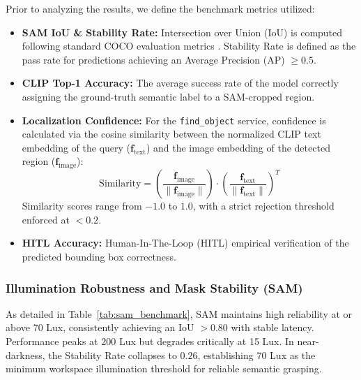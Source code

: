 \documentclass[12pt]{extarticle}
\begin{document}
Prior to analyzing the results, we define the benchmark metrics utilized:
\begin{itemize}
    \item \textbf{SAM IoU \& Stability Rate:} Intersection over Union (IoU) is computed following standard COCO evaluation metrics \cite{lin2014microsoft}. Stability Rate is defined as the pass rate for predictions achieving an Average Precision (AP) $\ge 0.5$.
    \item \textbf{CLIP Top-1 Accuracy:} The average success rate of the model correctly assigning the ground-truth semantic label to a SAM-cropped region.
    \item \textbf{Localization Confidence:} For the \texttt{find\_object} service, confidence is calculated via the cosine similarity between the normalized CLIP text embedding of the query ($\mathbf{f}_{\text{text}}$) and the image embedding of the detected region ($\mathbf{f}_{\text{image}}$):
    $$ \text{Similarity} = \left( \frac{\mathbf{f}_{\text{image}}}{\|\mathbf{f}_{\text{image}}\|} \right) \cdot \left( \frac{\mathbf{f}_{\text{text}}}{\|\mathbf{f}_{\text{text}}\|} \right)^T $$
    Similarity scores range from $-1.0$ to $1.0$, with a strict rejection threshold enforced at $< 0.2$.
    \item \textbf{HITL Accuracy:} Human-In-The-Loop (HITL) empirical verification of the predicted bounding box correctness.
\end{itemize}

\subsubsection*{Illumination Robustness and Mask Stability (SAM)}
As detailed in Table~\ref{tab:sam_benchmark}, SAM maintains high reliability at or above 70 Lux, consistently achieving an IoU $> 0.80$ with stable latency. Performance peaks at 200 Lux but degrades critically at 15 Lux. In near-darkness, the Stability Rate collapses to $0.26$, establishing 70 Lux as the minimum workspace illumination threshold for reliable semantic grasping.
\end{document}
